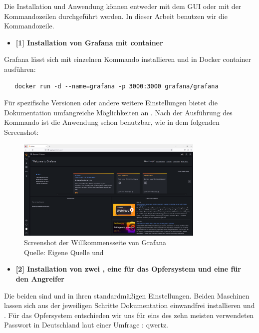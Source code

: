 Die Installation und Anwendung können entweder mit dem \gls{GUI} oder mit der Kommandozeilen durchgeführt werden. In dieser Arbeit benutzen wir die Kommandozeile. 

\begin{itemize}[noitemsep]
   \item \textbf{[1] Installation von Grafana mit \gls{container}}
\end{itemize}

Grafana lässt sich mit einzelnen Kommando installieren und in Docker \gls{container} ausführen:

\begin{verbatim}
   docker run -d --name=grafana -p 3000:3000 grafana/grafana
\end{verbatim}

Für spezifische Versionen oder andere weitere Einstellungen bietet die Dokumentation  umfangreiche Möglichkeiten an \citep{Grafana_run}. Nach der Ausführung des Kommando ist die Anwendung schon benutzbar, wie in dem folgenden Screenshot:

\begin{figure}[H]
   \centering
   \includegraphics[width=0.8\textwidth]{assets/Installation_Grafana.png}
   \caption{Screenshot der Willkommensseite von Grafana\\Quelle: Eigene Quelle und \citep{Grafana_Logs}}
   \centering
\end{figure}

\begin{itemize}[noitemsep]
   \item	\textbf{[2] Installation von zwei , eine für das Opfersystem und eine für den Angreifer}
\end{itemize}

Die beiden  sind  und  in ihren standardmäßigen Einstellungen. Beiden Maschinen lassen sich aus der jeweiligen Schritte Dokumentation einwandfrei installieren \citep{kali_vm} und \citep{Ubuntu_server}. Für das Opfersystem entschieden wir uns für eins des zehn meisten verwendeten Passwort in Deutschland laut einer Umfrage \citep{silicon_passwort}: qwertz.  


